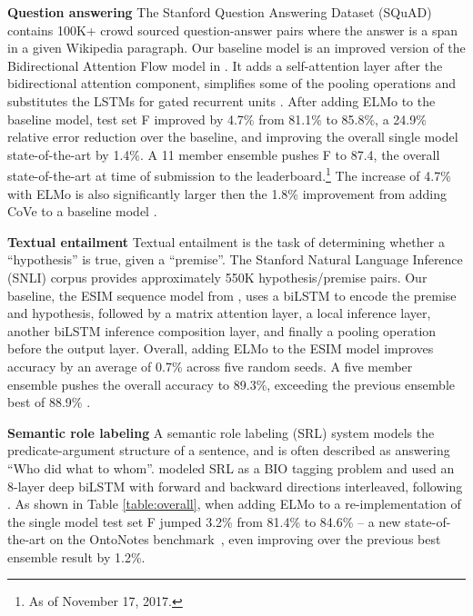 \documentclass[11pt,a4paper]{article}
\newcommand{\ELMO}{ELMo}
\newcommand{\tinysection}[1]{\textbf{#1}}
\begin{document}
\tinysection{Question answering}
The Stanford Question Answering Dataset (SQuAD) \citep{Rajpurkar2016SQuAD10} contains 100K+ crowd sourced question-answer pairs where the answer is a span in a given Wikipedia paragraph.
Our baseline model \citep{ClarkAdvancingRC} is an improved version of the Bidirectional Attention Flow model in \citet[BiDAF; ][]{Seo2016BidirectionalAF}.  It adds a self-attention layer after the bidirectional attention component, simplifies some of the pooling operations and substitutes the LSTMs for gated recurrent units \citep[GRUs; ][]{GRU:Cho2014}.
After adding \ELMO{} to the baseline model, test set F improved by 4.7\% from 81.1\% to 85.8\%, a 24.9\% relative error reduction over the baseline, and improving the overall single model state-of-the-art by 1.4\%.
A 11 member ensemble pushes F to 87.4, the overall state-of-the-art at time of submission to the leaderboard.\footnote{As of November 17, 2017. }
The increase of 4.7\% with ELMo is also significantly larger then the 1.8\% improvement from adding CoVe to a baseline model \citep{McCann2017LearnedIT}.



\tinysection{Textual entailment}
Textual entailment is the task of determining whether a ``hypothesis'' is true, given a ``premise''.
The Stanford Natural Language Inference (SNLI) corpus \citep{snliemnlp2015} provides approximately 550K hypothesis/premise pairs. Our baseline, the ESIM sequence model
from \citet{Chen2017EnhancedLF}, uses a biLSTM to encode the premise and hypothesis, followed by a matrix attention layer, a local inference layer, another biLSTM inference composition layer, and finally a pooling operation before the output layer.
Overall, adding \ELMO{} to the ESIM model improves accuracy by an average of 0.7\% across five random seeds. A five member ensemble pushes the overall accuracy to 89.3\%, exceeding the previous ensemble best of 88.9\% \citep{Gong2017NaturalLI}.


\tinysection{Semantic role labeling}
A semantic role labeling (SRL) system models the predicate-argument structure of a sentence, and is often described as answering
``Who did what to whom''.
\citet{He2017DeepSR} modeled SRL as a BIO tagging problem and used an 8-layer deep biLSTM with forward and backward directions interleaved, following \citet{Zhou2015EndtoendLO}.
As shown in Table \ref{table:overall}, when adding \ELMO{} to a re-implementation of \citet{He2017DeepSR} the single model test set
F jumped 3.2\% from 81.4\% to 84.6\% -- a new state-of-the-art on the OntoNotes benchmark~\citep{Pradhan2013TowardsRL}, even improving over the previous best ensemble result by 1.2\%. 
\end{document}
